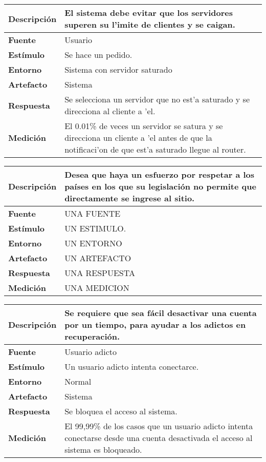 \begin{center}
  \begin{tabular}{| l | p{10cm} | }
    \hline
  \textbf{Descripción} & El sistema debe evitar que los servidores superen su l'imite de clientes y se caigan.\\  \hline
  \textbf{Fuente} & Usuario\\  \hline
  \textbf{Estímulo} & Se hace un pedido.\\  \hline
  \textbf{Entorno} & Sistema con servidor saturado\\  \hline
  \textbf{Artefacto} & Sistema\\  \hline
  \textbf{Respuesta} & Se selecciona un servidor que no est'a saturado y se direcciona al cliente a 'el.\\  \hline
  \textbf{Medición} & El 0.01\% de veces un servidor se satura y se direcciona un cliente a 'el antes de que la notificaci'on de que est'a saturado llegue al router.\\  \hline
  \end{tabular}
\end{center} 

\begin{center}
  \begin{tabular}{| l | p{10cm} | }
    \hline
  \textbf{Descripción} & Desea que haya un esfuerzo por respetar a los países en los que su legislación no permite que directamente se ingrese al sitio.\\  \hline
  \textbf{Fuente} & UNA FUENTE\\  \hline
  \textbf{Estímulo} & UN ESTIMULO.\\  \hline
  \textbf{Entorno} & UN ENTORNO\\  \hline
  \textbf{Artefacto} & UN ARTEFACTO\\  \hline
  \textbf{Respuesta} & UNA RESPUESTA\\  \hline
  \textbf{Medición} & UNA MEDICION\\  \hline
  \end{tabular}
\end{center} 


\begin{center}
  \begin{tabular}{| l | p{10cm} | }
    \hline
  \textbf{Descripción} & Se requiere que sea fácil desactivar una cuenta por un tiempo, para ayudar a los adictos en recuperación.\\  \hline
  \textbf{Fuente} & Usuario adicto\\  \hline
  \textbf{Estímulo} & Un usuario adicto intenta conectarce.\\  \hline
  \textbf{Entorno} & Normal\\  \hline
  \textbf{Artefacto} & Sistema\\  \hline
  \textbf{Respuesta} & Se bloquea el acceso al sistema.\\  \hline
  \textbf{Medición} & El 99,99\% de los casos que un usuario adicto intenta conectarse desde una cuenta desactivada el acceso al sistema es bloqueado.\\  \hline
  \end{tabular}
\end{center} 





